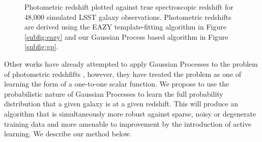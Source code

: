 \documentclass[useAMS,usenatbib,tightenlines,11pt,preprint]{aastex}
\begin{document}
\begin{figure}
\caption{
Photometric redshift plotted
against true spectroscopic redshift for 48,000 simulated LSST galaxy
observations.  Photometric redshifts are derived using the
EAZY template-fitting
algorithm in Figure \ref{subfig:eazy} and
our Gaussian Process based algorithm in Figure \ref{subfig:gp}.
}
\label{fig:scatter}
\end{figure}

Other works have already attempted to apply Gaussian Processes to the problem of
photometric redshfifts \cite{kaufman,bonfield}, however, they have treated the
problem as one of learning the form of a one-to-one scalar function.  We propose
to use the probabilistic nature of Gaussian Processes to learn the full
probability distribution that a given galaxy is at a given redshift.  
This will produce an algorithm that is simultaneously more robust against
sparse, noisy or degenerate training data and more amenable to improvement 
by the introduction of
active learning.  We describe our method below.
\end{document}
